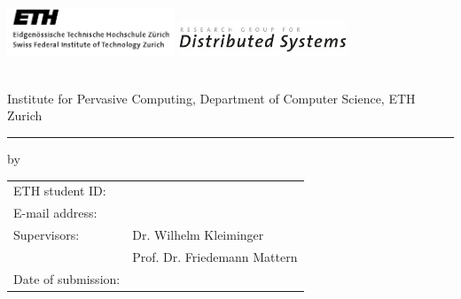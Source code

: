 \begin{titlepage}

	\flushleft
	
	\vspace*{-20mm}
	{
		\includegraphics[width=5cm]{images/logos/logo_ETH} 
		\hfill
		\includegraphics[width=5cm]{images/logos/logo_DSG}
	}
	  
  \vfill
  \vfill

  	{\Huge \sffamily \bfseries \thesisType}\\[3mm]Institute for Pervasive Computing, Department of Computer Science, ETH Zurich
  	\rule{\textwidth}{1mm}
  
  \vfill
	
	\begin{center}
	 		\Huge \sffamily \bfseries
	 		\thesisTitle
 	\end{center}
 	
 	\vspace{10pt}
 	
 	\begin{center}
 		\Large
  		by \thesisAuthor
	
 	\end{center}
 	
 	\vspace{10pt}
  
  \begin{center}
 		\Large
 		\thesisSemester
 	\end{center}
  
  \vfill
  \vfill
  \vfill
  
  	\setlength{\tabcolsep}{0mm}
		\begin{tabular}{p{40mm}l}
			ETH student ID:     & \thesisETHID \\[1mm]
			E-mail address:     & \thesisEmail \\[5mm]
			Supervisors:        & Dr. Wilhelm Kleiminger\\[1mm]
			                    & Prof. Dr. Friedemann Mattern\\[5mm]
			Date of submission: & \thesisSubmission
		\end{tabular}
	
\end{titlepage}

\thispagestyle{empty}
\begin{center}
\parbox{0mm}{}
\end{center}